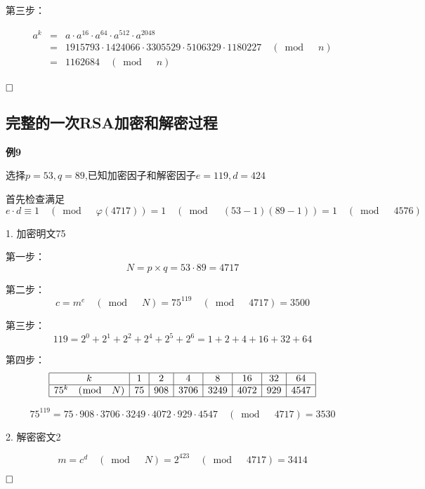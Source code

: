 \documentclass{article}
\begin{document}
第三步：


\begin{eqnarray}   
\label{eq}
a^{k} &=& a \cdot a^{16} \cdot a^{64} \cdot a^{512} \cdot a^{2048}  \nonumber \\ 
 &=& 1915793 \cdot 1424066 \cdot 3305529 \cdot 5106329 \cdot 1180227 \quad (\bmod \quad n) \nonumber \\ 
 &=&  1162684 \quad (\bmod \quad n) \nonumber \\ 
\nonumber 
\end{eqnarray}

$\hfill\square$ 

\subsection{完整的一次RSA加密和解密过程}

\textbf{例9}

选择$p=53,q = 89$,已知加密因子和解密因子$e = 119,d = 424$

首先检查满足$e \cdot d \equiv 1 \quad (\bmod \quad \varphi(4717))= 1 \quad (\bmod \quad (53-1)(89-1))  = 1 \quad (\bmod \quad 4576) $

1. 加密明文75

第一步：
$$N = p \times q = 53 \cdot 89 =4717$$

第二步：
$$c = m^e \quad (\bmod \quad N) = 75^{119} \quad (\bmod \quad 4717) = 3500$$

第三步：
$$119 = 2^0+2^1+2^2+2^4+2^5+2^6 = 1+2+4+16+32+64$$

第四步：
$$
\begin{array}{|c|c|c|c|c|c|c|c|}
\hline
k & 1 & 2 & 4 & 8 & 16 & 32 & 64 \\
\hline
75^k \quad (\bmod \quad N) & 75 &908&3706&3249&4072&929&4547\\
\hline
\end{array}
$$

$$75^{119} = 75\cdot908\cdot3706\cdot3249\cdot4072\cdot929\cdot4547 \quad (\bmod \quad 4717)  = 3530$$

2. 解密密文2

$$m = c^d \quad (\bmod \quad N) = 2^{423} \quad (\bmod \quad 4717) = 3414$$

$\hfill\square$ 
\end{document}
